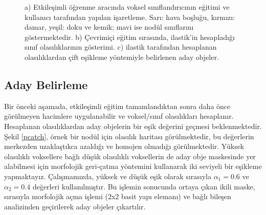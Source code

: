 \documentclass[conference]{IEEEtran}
\begin{document}
\begin{figure}[tb]
\caption{a) Etkileşimli öğrenme aracında voksel sınıflandırıcının eğitimi ve kullanıcı tarafından yapılan işaretleme. Sarı: hava boşluğu, kırmızı: damar, yeşil: doku ve kemik; mavi ise nodül sınıflarını göstermektedir. b) Çevrimiçi eğitim sırasında, ilastik'in hesapladığı sınıf olasılıklarının gösterimi. c) ilastik tarafından hesaplanan olasılıklardan çift eşikleme yöntemiyle belirlenen aday objeler.}
\label{fig1}
\end{figure}

\subsection{Aday Belirleme}
Bir önceki aşamada, etkileşimli eğitim tamamlandıktan sonra daha önce görülmeyen hacimlere uygulanabilir ve voksel/sınıf olasılıkları hesaplanır. Hesaplanan olasılıklardan aday objelerin bir eşik değerini geçmesi beklenmektedir. Şekil \ref{pcatch}, örnek bir nodül için olasılık haritası görülmektedir, bu değerlerin merkezden uzaklaştıkca azaldığı ve homojen olmadığı görülmektedir. Yüksek olasılıklı voksellere bağlı düşük olasılıklı voksellerin de aday obje maskesinde yer alabilmesi için morfolojik geri-çatma yöntemini kullanarak iki seviyeli bir eşikleme yapmaktayız. Çalışmamızda, yüksek ve düşük eşik olarak sırasıyla $\alpha_1 = 0.6$ ve $\alpha_2 = 0.4$ değerleri kullanılmıştır. Bu işlemin sonucunda ortaya çıkan ikili maske, sırasıyla morfolojik açma işlemi (2x2 basit yapı elemanı) ve bağlı bileşen analizinden geçirilerek aday objeler çıkartılır.
\end{document}
